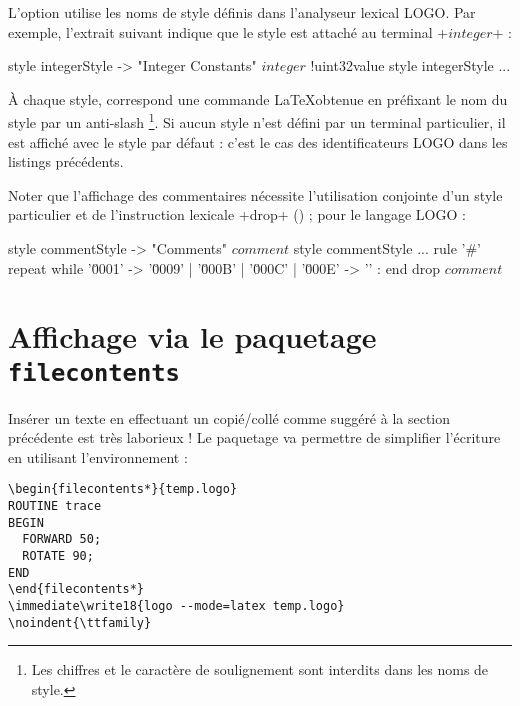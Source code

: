 
L'option  utilise les noms de style définis dans l'analyseur lexical LOGO. Par exemple, l'extrait suivant indique que le style  est attaché au terminal \ggs+$integer$+ :

\begin{galgas}
style integerStyle -> "Integer Constants"
$integer$ !uint32value style integerStyle ...
\end{galgas}

À chaque style, correspond une commande \LaTeX obtenue en préfixant le nom du style par un anti-slash \tpp{\textbackslash}\footnote{Les chiffres et le caractère de soulignement \tpp{\_} sont interdits dans les noms de style.}. Si aucun style n'est défini par un terminal particulier, il est affiché avec le style par défaut : c'est le cas des identificateurs LOGO dans les listings précédents.

Noter que l'affichage des commentaires nécessite l'utilisation conjointe d'un style particulier et de l'instruction lexicale \ggs+drop+ () ; pour le langage LOGO :

\begin{galgas}
style commentStyle -> "Comments"
$comment$ style commentStyle ...
rule '#' {
  repeat
  while '\u0001' -> '\u0009' | '\u000B' | '\u000C' | '\u000E' -> '\uFFFD' :
  end
  drop $comment$
}
\end{galgas}







\section{Affichage via le paquetage \texttt{f{}ilecontents}}

Insérer un texte en effectuant un copié/collé comme suggéré à la section précédente est très laborieux ! Le paquetage  va permettre de simplifier l'écriture en utilisant l'environnement  :

\begin{verbatim}
\begin{filecontents*}{temp.logo}
ROUTINE trace
BEGIN
  FORWARD 50;
  ROTATE 90;
END
\end{filecontents*}
\immediate\write18{logo --mode=latex temp.logo}
\noindent{\ttfamily}
\end{verbatim}

